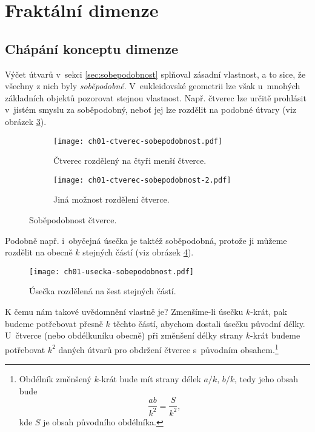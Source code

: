 \section{Fraktální dimenze}\label{sec:fraktalni_dimenze}

\subsection{Chápání konceptu dimenze}\label{subsec:koncept-dimenze}

Výčet útvarů v~sekci \ref{sec:sobepodobnost} splňoval zásadní vlastnost, a to sice, že všechny z nich byly \emph{soběpodobné}. V~eukleidovské geometrii lze však u~mnohých základních objektů pozorovat stejnou vlastnost. Např. čtverec lze určitě prohlásit v~jistém smyslu za soběpodobný, neboť jej lze rozdělit na podobné útvary (viz obrázek \ref{fig:sobepodobnost-ctverce}).
\begin{figure}[h]
    \centering
    \begin{subfigure}[b]{\subfigwidth}
        \centering
        \texttt{[image: ch01-ctverec-sobepodobnost.pdf]}
        \caption{Čtverec rozdělený na čtyři menší čtverce.}
        \label{subfig:sobepodobnost-ctverce-1}
    \end{subfigure}
    \begin{subfigure}[b]{\subfigwidth}
        \centering
        \texttt{[image: ch01-ctverec-sobepodobnost-2.pdf]}
        \caption{Jiná možnost rozdělení čtverce.}
        \label{subfig:sobepodobnost-ctverce-2}
    \end{subfigure}
    \caption{Soběpodobnost čtverce.}
    \label{fig:sobepodobnost-ctverce}
\end{figure}
Podobně např. i~obyčejná úsečka je taktéž soběpodobná, protože ji můžeme rozdělit na obecně $k$ stejných částí (viz obrázek \ref*{fig:sobepodobnost-usecky}).\par
\begin{figure}[h]
    \centering
    \texttt{[image: ch01-usecka-sobepodobnost.pdf]}
    \caption{Úsečka rozdělená na šest stejných částí.}
    \label{fig:sobepodobnost-usecky}
\end{figure}
K čemu nám takové uvědomnění vlastně je? Zmenšíme-li úsečku $k$-krát, pak budeme potřebovat přesně $k$ těchto částí, abychom dostali úsečku původní délky. U~čtverce (nebo obdélkuníku obecně) při změnšení délky strany $k$-krát budeme potřebovat $k^2$ daných útvarů pro obdržení čtverce s~původním obsahem.\footnote{Obdélník změnšený $k$-krát bude mít strany délek $a/k,\,b/k$, tedy jeho obsah bude
\[\dfrac{ab}{k^2}=\dfrac{S}{k^2},\]
kde $S$ je obsah původního obdélníka.}
